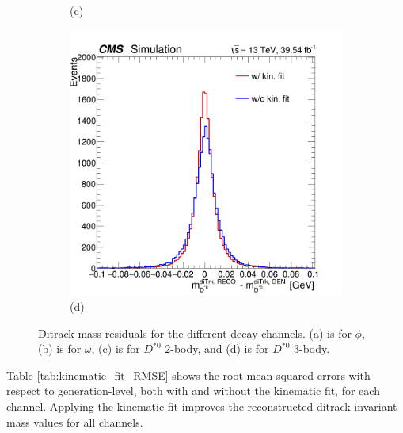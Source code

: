 \begin{myitemlist}
\begin{figure}[!ht]
\begin{subfigure}[t]{0.50\mylength}
                \caption{\footnotesize (c)}
        \end{subfigure}%
        \begin{subfigure}[t]{0.50\mylength}
                \centering
                \includegraphics[width=0.45\mylength]{resources/plots/D0Star_3body_kinematic_fit_residual.png}
                \caption{\footnotesize (d)}
        \end{subfigure}%
        \vspace*{-0.0cm}
        \caption{Ditrack mass residuals for the different decay channels. (a) is for $\phi$, (b) is for $\omega$, (c) is for $D^{*0}$ 2-body, and (d) is for $D^{*0}$ 3-body.}
        \label{fig:kinematic_fit_residuals}
        \vspace*{-0.0cm}
    \end{figure}
    Table \ref{tab:kinematic_fit_RMSE} shows the root mean squared errors with respect to generation-level, both with and without the kinematic fit, for each channel. Applying the kinematic fit improves the reconstructed ditrack invariant mass values for all channels.


\end{myitemlist}
